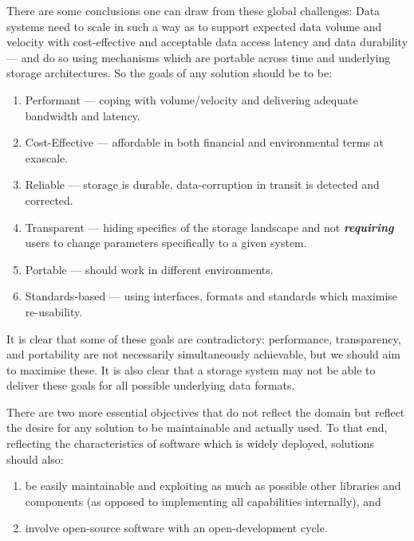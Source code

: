 There are some conclusions one can draw from these global challenges:
Data systems need to scale in such a way as to support expected data volume and velocity with cost-effective
and acceptable data access latency and data durability --- and do so using mechanisms which are portable across time and underlying storage architectures.
So the goals of any solution should be to be:
\begin{enumerate}
\item Performant --- coping with volume/velocity and delivering adequate bandwidth and latency.
\item Cost-Effective --- affordable in both financial and environmental terms at exascale.
\item Reliable --- storage is durable, data-corruption in transit is detected and corrected.
\item Transparent --- hiding specifics of the storage landscape and not \textit{\textbf{requiring}} users to change parameters specifically to a given system.
\item Portable --- should work in different environments.
\item Standards-based --- using interfaces, formats and standards which maximise re-usability.
\end{enumerate}

It is clear that some of these goals are contradictory:
performance, transparency, and portability are not necessarily simultaneously achievable,
but we should aim to maximise these.
It is also clear that a storage system may not be able to deliver these goals for all possible underlying data formats.

There are two more essential objectives that do not reflect the domain but reflect the desire for any solution to be maintainable and actually used.
To that end, reflecting the characteristics of software which is widely deployed, solutions should also:
\begin{enumerate}[resume]
\item be easily maintainable and exploiting as much as possible other libraries and components (as opposed to implementing all capabilities internally), and
\item involve open-source software with an open-development cycle.
\end{enumerate}
